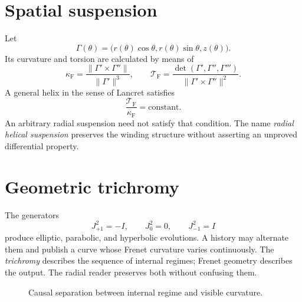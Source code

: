 \section{Spatial suspension}

Let
\[
 \Gamma(\theta)=
 \bigl(r(\theta)\cos\theta,r(\theta)\sin\theta,z(\theta)\bigr).
\]
Its curvature and torsion are calculated by means of
\[
 \kappa_{\mathrm{F}}=\frac{\|\Gamma'\times\Gamma''\|}{\|\Gamma'\|^3},
 \qquad
 \mathcal T_{\mathrm{F}}=
 \frac{\det(\Gamma',\Gamma'',\Gamma''')}
 {\|\Gamma'\times\Gamma''\|^2}.
\]
A general helix in the sense of Lancret satisfies
\[
 \frac{\mathcal T_{\mathrm{F}}}{\kappa_{\mathrm{F}}}=\text{constant}.
\]
An arbitrary radial suspension need not satisfy that condition. The
name \emph{radial helical suspension} preserves the winding structure
without asserting an unproved differential property.

\section{Geometric trichromy}

The generators
\[
 J_{+1}^2=-I,\qquad J_0^2=0,\qquad J_{-1}^2=I
\]
produce elliptic, parabolic, and hyperbolic evolutions. A history may
alternate them and publish a curve whose Frenet curvature varies
continuously. The \emph{trichromy} describes the sequence of internal regimes;
Frenet geometry describes the output. The radial reader preserves both
without confusing them.

\begin{figure}[htbp]
\centering
{}
\caption{Causal separation between internal regime and visible curvature.}
\label{espiral:fig:trit-frenet}
\end{figure}

